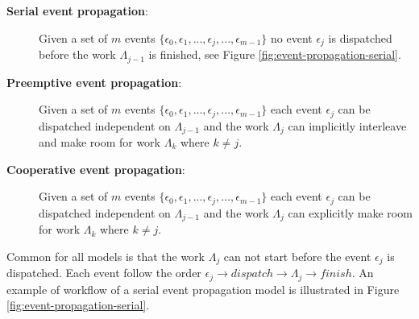 \begin{description}

    \item[\textbf{Serial event propagation}:] Given a set of $m$ events $\{
            \epsilon_0, \epsilon_1, ..., \epsilon_j, ..., \epsilon_{m-1} \}$ no
        event $\epsilon_j$ is dispatched before the work $\Lambda_{j-1}$ is
        finished, see Figure \ref{fig:event-propagation-serial}.

    \item[\textbf{Preemptive event propagation}:] Given a set of $m$ events $\{
            \epsilon_0, \epsilon_1, ..., \epsilon_j, ..., \epsilon_{m-1} \}$
        each event $\epsilon_j$ can be dispatched independent on
        $\Lambda_{j-1}$ and the work $\Lambda_j$ can implicitly interleave and
        make room for work $\Lambda_k$ where $k \ne j$.

    \item[\textbf{Cooperative event propagation}:] Given a set of $m$ events
        $\{ \epsilon_0, \epsilon_1, ..., \epsilon_j, ..., \epsilon_{m-1} \}$
        each event $\epsilon_j$ can be dispatched independent on
        $\Lambda_{j-1}$ and the work $\Lambda_j$ can explicitly make room for
        work $\Lambda_k$ where $k \ne j$.

\end{description}

Common for all models is that the work $\Lambda_j$ can not start before the
event $\epsilon_j$ is dispatched. Each event follow the order $\epsilon_j
\rightarrow dispatch \rightarrow \Lambda_j \rightarrow finish$. An example of
workflow of a serial event propagation model is illustrated in Figure
\ref{fig:event-propagation-serial}.


